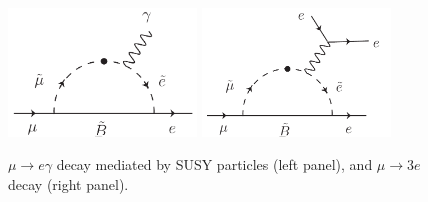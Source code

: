 \begin{figure}[htp]
\begin{center}
\includegraphics[width=5cm]{Figures/mu_e_gamma_diagram.pdf} \hspace*{2cm}
\includegraphics[width=5cm]{Figures/mu_3e_diagram.pdf}
\caption{\label{CL:mutoegamma}$\mu \rightarrow e\gamma$ decay mediated by SUSY particles (left panel), and $\mu \rightarrow 3e$ decay (right panel).}
\end{center}
\end{figure}
